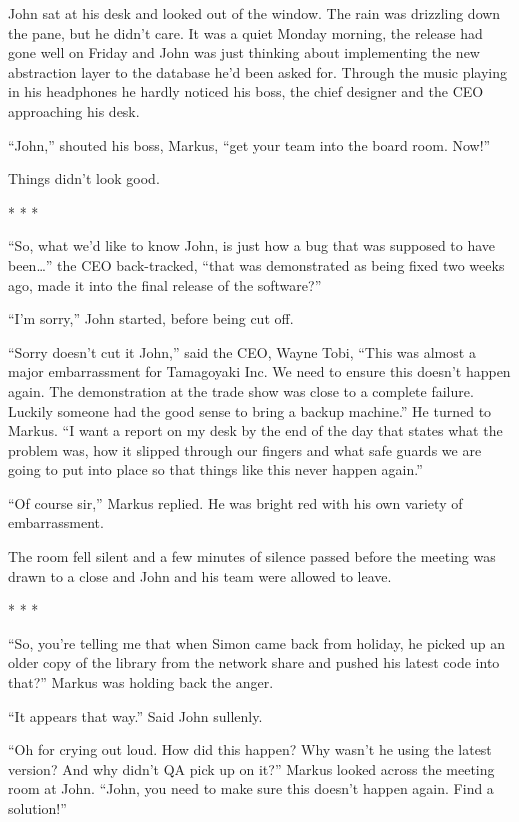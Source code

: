 \begin{trenches}
John sat at his desk and looked out of the window.  The rain was drizzling down the pane, but he didn't care.  It was a quiet Monday morning, the release had gone well on Friday and John was just thinking about implementing the new abstraction layer to the database he'd been asked for.  Through the music playing in his headphones he hardly noticed his boss, the chief designer and the CEO approaching his desk.  

``John,'' shouted his boss, Markus, ``get your team into the board room.  Now!''

Things didn't look good. 
 
\begin{center} * * * \end{center}

``So, what we'd like to know John, is just how a bug that was supposed to have been\ldots'' the CEO back-tracked, ``that was demonstrated as being fixed two weeks ago, made it into the final release of the software?''

``I'm sorry,'' John started, before being cut off.

``Sorry doesn't cut it John,'' said the CEO, Wayne Tobi, ``This was almost a major embarrassment for Tamagoyaki Inc.  We need to ensure this doesn't happen again.  The demonstration at the trade show was close to a complete failure.  Luckily someone had the good sense to bring a backup machine.''  He turned to Markus.  ``I want a report on my desk by the end of the day that states what the problem was, how it slipped through our fingers and what safe guards we are going to put into place so that things like this never happen again.''

``Of course sir,'' Markus replied.  He was bright red with his own variety of embarrassment.

The room fell silent and a few minutes of silence passed before the meeting was drawn to a close and John and his team were allowed to leave.

\begin{center} * * * \end{center}

``So, you're telling me that when Simon came back from holiday, he picked up an older copy of the library from the network share and pushed his latest code into that?''  Markus was holding back the anger.

``It appears that way.''  Said John sullenly.

``Oh for crying out loud.  How did this happen?  Why wasn't he using the latest version?  And why didn't QA pick up on it?''  Markus looked across the meeting room at John.  ``John, you need to make sure this doesn't happen again.  Find a solution!''
\end{trenches}

